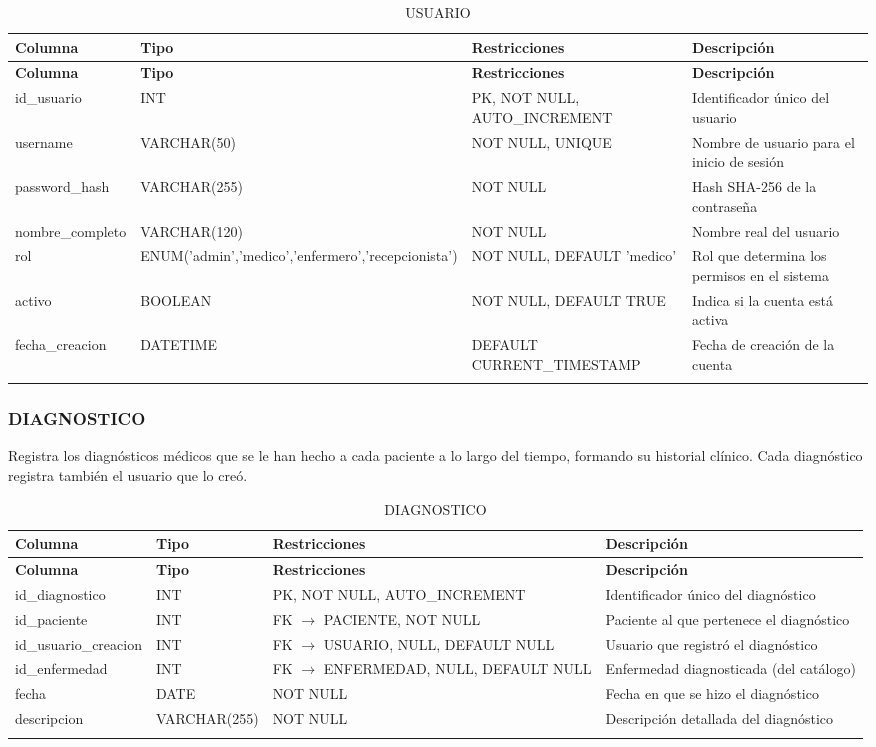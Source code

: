 \documentclass[12pt,a4paper]{article}
\begin{document}
{\small\begin{longtable}{|p{2.3cm}|p{3.3cm}|p{4.2cm}|p{4.2cm}|}
\hline
\textbf{Columna} & \textbf{Tipo} & \textbf{Restricciones} & \textbf{Descripci\'on} \\ \hline
\endfirsthead
\hline
\textbf{Columna} & \textbf{Tipo} & \textbf{Restricciones} & \textbf{Descripci\'on} \\ \hline
\endhead
id\_usuario & INT & PK, NOT NULL, AUTO\_INCREMENT & Identificador \'unico del usuario \\ \hline
username & VARCHAR(50) & NOT NULL, UNIQUE & Nombre de usuario para el inicio de sesi\'on \\ \hline
password\_hash & VARCHAR(255) & NOT NULL & Hash SHA-256 de la contrase\~na \\ \hline
nombre\_completo & VARCHAR(120) & NOT NULL & Nombre real del usuario \\ \hline
rol & ENUM('admin','medico','enfermero','recepcionista') & NOT NULL, DEFAULT 'medico' & Rol que determina los permisos en el sistema \\ \hline
activo & BOOLEAN & NOT NULL, DEFAULT TRUE & Indica si la cuenta est\'a activa \\ \hline
fecha\_creacion & DATETIME & DEFAULT CURRENT\_TIMESTAMP & Fecha de creaci\'on de la cuenta \\ \hline
\caption{USUARIO}
\end{longtable}}

\subsubsection{DIAGNOSTICO}
Registra los diagn\'osticos m\'edicos que se le han hecho a cada paciente a lo largo del tiempo, formando su historial cl\'inico. Cada diagn\'ostico registra tambi\'en el usuario que lo cre\'o.

{\small\begin{longtable}{|p{2.3cm}|p{3.3cm}|p{4.2cm}|p{4.2cm}|}
\hline
\textbf{Columna} & \textbf{Tipo} & \textbf{Restricciones} & \textbf{Descripci\'on} \\ \hline
\endfirsthead
\hline
\textbf{Columna} & \textbf{Tipo} & \textbf{Restricciones} & \textbf{Descripci\'on} \\ \hline
\endhead
id\_diagnostico & INT & PK, NOT NULL, AUTO\_INCREMENT & Identificador \'unico del diagn\'ostico \\ \hline
id\_paciente & INT & FK $\rightarrow$ PACIENTE, NOT NULL & Paciente al que pertenece el diagn\'ostico \\ \hline
id\_usuario\_creacion & INT & FK $\rightarrow$ USUARIO, NULL, DEFAULT NULL & Usuario que registr\'o el diagn\'ostico \\ \hline
id\_enfermedad & INT & FK $\rightarrow$ ENFERMEDAD, NULL, DEFAULT NULL & Enfermedad diagnosticada (del cat\'alogo) \\ \hline
fecha & DATE & NOT NULL & Fecha en que se hizo el diagn\'ostico \\ \hline
descripcion & VARCHAR(255) & NOT NULL & Descripci\'on detallada del diagn\'ostico \\ \hline
\caption{DIAGNOSTICO}
\end{longtable}}
\end{document}
